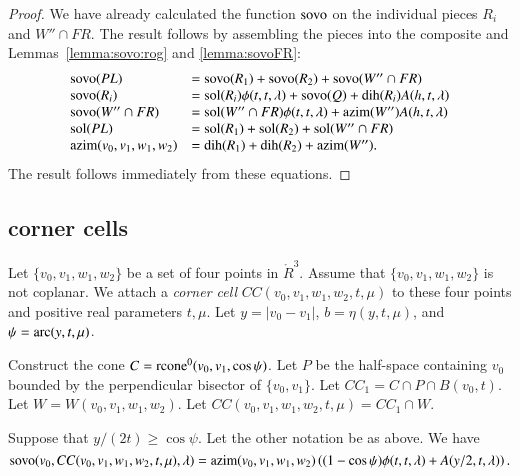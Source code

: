 \begin{proof} We have already calculated the function ${\operatorname{sovo}}$
on the individual pieces $R_i$ and $W''\cap FR$.  The result
follows by assembling the pieces into the composite and 
Lemmas~\ref{lemma:sovo:rog} and \ref{lemma:sovoFR}:
  $$
  \begin{array}{lll}
  {\operatorname{sovo}}(PL) &= {\operatorname{sovo}}(R_1) + {\operatorname{sovo}}(R_2) + {\operatorname{sovo}}(W''\cap FR) \\
  {\operatorname{sovo}}(R_i) &= {\operatorname{sol}}(R_i) \phi(t,t,\lambda) +{\operatorname{sovo}}(Q)
   + \operatorname{dih}(R_i) A(h,t,\lambda)\\
  {\operatorname{sovo}}(W''\cap FR) &= {\operatorname{sol}}(W''\cap FR)\phi(t,t,\lambda) +
   {\operatorname{azim}}(W'') A(h,t,\lambda)\\
  \operatorname{sol}(PL) &=\operatorname{sol}(R_1)+\operatorname{sol}(R_2)+\operatorname{sol}(W''\cap FR)\\
  {\operatorname{azim}}(v_0,v_1,w_1,w_2) &= \operatorname{dih}(R_1)+\operatorname{dih}(R_2)+{\operatorname{azim}}(W'').
  \end{array}
  $$
The result follows immediately from these equations.
\end{proof}



\subsection{corner cells}

Let $\{v_0,v_1,w_1,w_2\}$ be a set of four points in $\ring{R}^3$.  
Assume that $\{v_0,v_1,w_1,w_2\}$ is not coplanar.
We
attach a {\it corner cell} $CC(v_0,v_1,w_1,w_2,t,\mu)$
to these four points and positive
real parameters $t,\mu$.  Let $y=|v_0-v_1|$, 
 $b=\eta(y,t,\mu)$, and $\psi=\operatorname{arc}(y,t,\mu)$.

Construct the cone $C={\operatorname{rcone}}^0(v_0,v_1,\cos\psi)$.
Let $P$ be the half-space containing $v_0$ bounded by
the perpendicular bisector of  $\{v_0,v_1\}$.
Let $CC_1 = C\cap P \cap B(v_0,t)$.
Let $W=W(v_0,v_1,w_1,w_2)$.
Let $CC(v_0,v_1,w_1,w_2,t,\mu) = CC_1 \cap W$.

\begin{lemma} 
Suppose that $y/(2t) \ge \cos\psi$.  Let the other notation
be as above.   We have
  $$
  {\operatorname{sovo}}(v_0,CC(v_0,v_1,w_1,w_2,t,\mu),\lambda)=
  {\operatorname{azim}}(v_0,v_1,w_1,w_2) \left((1-\cos\psi)\phi(t,t,\lambda)+
    A(y/2,t,\lambda)\right).
  $$
\end{lemma}

